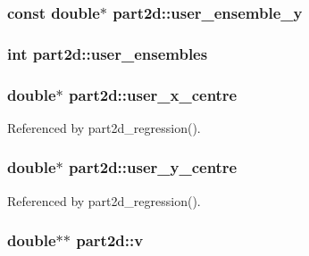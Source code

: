 \subsubsection[{\texorpdfstring{user\+\_\+ensemble\+\_\+y}{user_ensemble_y}}]{\setlength{\rightskip}{0pt plus 5cm}const double$\ast$ part2d\+::user\+\_\+ensemble\+\_\+y}\hypertarget{structpart2d_aeb3a65f1156f2e76b22a10713969a844}{}\label{structpart2d_aeb3a65f1156f2e76b22a10713969a844}
\subsubsection[{\texorpdfstring{user\+\_\+ensembles}{user_ensembles}}]{\setlength{\rightskip}{0pt plus 5cm}int part2d\+::user\+\_\+ensembles}\hypertarget{structpart2d_a24f027dbc300017992443f903760a74b}{}\label{structpart2d_a24f027dbc300017992443f903760a74b}
\subsubsection[{\texorpdfstring{user\+\_\+x\+\_\+centre}{user_x_centre}}]{\setlength{\rightskip}{0pt plus 5cm}double$\ast$ part2d\+::user\+\_\+x\+\_\+centre}\hypertarget{structpart2d_a0b2cdfa694b427e708ffe16229791240}{}\label{structpart2d_a0b2cdfa694b427e708ffe16229791240}


Referenced by part2d\+\_\+regression().

\subsubsection[{\texorpdfstring{user\+\_\+y\+\_\+centre}{user_y_centre}}]{\setlength{\rightskip}{0pt plus 5cm}double$\ast$ part2d\+::user\+\_\+y\+\_\+centre}\hypertarget{structpart2d_ad231783a3d59a2dccc9b25f5b9744ed9}{}\label{structpart2d_ad231783a3d59a2dccc9b25f5b9744ed9}


Referenced by part2d\+\_\+regression().

\subsubsection[{\texorpdfstring{v}{v}}]{\setlength{\rightskip}{0pt plus 5cm}double$\ast$$\ast$ part2d\+::v}\hypertarget{structpart2d_ab71005708c61f1816df818fd2f19d403}{}\label{structpart2d_ab71005708c61f1816df818fd2f19d403}



